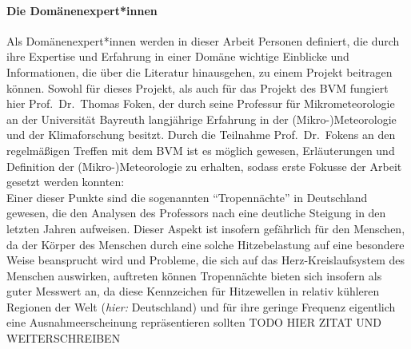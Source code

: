 \paragraph{Die Domänenexpert*innen}
Als Domänenexpert*innen werden in dieser Arbeit Personen definiert, die durch ihre Expertise und Erfahrung in einer Domäne wichtige Einblicke und Informationen, die über die Literatur hinausgehen, zu einem Projekt beitragen können. Sowohl für dieses Projekt, als auch für das Projekt des \ac{BVM} fungiert hier Prof.\ Dr.\ Thomas Foken, der durch seine Professur für Mikrometeorologie an der Universität Bayreuth langjährige Erfahrung in der (Mikro-)Meteorologie und der Klimaforschung besitzt. Durch die Teilnahme Prof.\ Dr.\ Fokens an den regelmäßigen Treffen mit dem \ac{BVM} ist es möglich gewesen, Erläuterungen und Definition der (Mikro-)Meteorologie zu erhalten, sodass erste Fokusse der Arbeit gesetzt werden konnten: \\ Einer dieser Punkte sind die sogenannten \enquote{Tropennächte} in Deutschland gewesen, die den Analysen des Professors nach eine deutliche Steigung in den letzten Jahren aufweisen. Dieser Aspekt ist insofern gefährlich für den Menschen, da der Körper des Menschen durch eine solche Hitzebelastung auf eine besondere Weise beansprucht wird und Probleme, die sich auf das Herz-Kreislaufsystem des Menschen auswirken, auftreten können \cite{Umweltbundesamt2023Hitze}
Tropennächte bieten sich insofern als guter Messwert an, da diese Kennzeichen für Hitzewellen in relativ kühleren Regionen der Welt (\textit{hier:} Deutschland) und für ihre geringe Frequenz eigentlich eine Ausnahmeerscheinung repräsentieren sollten TODO HIER ZITAT UND WEITERSCHREIBEN

